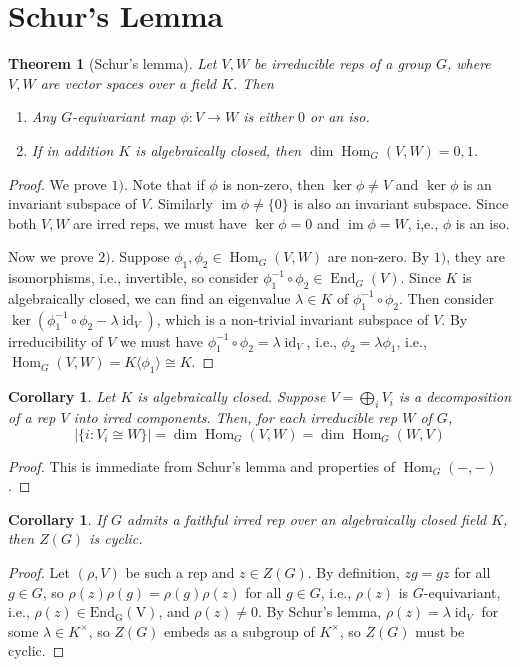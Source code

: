 \documentclass{article}
\theoremstyle{definition}
\theoremstyle{remark}
\theoremstyle{plain}
\newtheorem{thm}[defn]{Theorem}
\newtheorem{crly}[defn]{Corollary}
\newcommand{\Hom}{\operatorname{Hom}}
\newcommand{\im}{\operatorname{im}}
\newcommand{\id}{\operatorname{id}}
\begin{document}
\section{Schur's Lemma}
\begin{thm}[Schur's lemma]
    Let $V, W$ be irreducible reps of a group $G$, where $V, W$ are vector spaces over a field $K$. Then
    \begin{enumerate}
        \item Any $G$-equivariant map $\phi:V\to W$ is either $0$ or an iso.
        \item If in addition $K$ is algebraically closed, then $\dim \Hom_G(V,W)=0,1$. 
    \end{enumerate}
\end{thm}
\begin{proof}
    We prove $1)$. Note that if $\phi$ is non-zero, then $\ker\phi\neq V$ and $\ker\phi$ is an invariant subspace of $V$. Similarly $\im\phi\neq \{0\}$ is also an invariant subspace. Since both $V,W$ are irred reps, we must have $\ker\phi=0$ and $\im\phi=W$, i,e., $\phi$ is an iso.

    Now we prove $2)$. Suppose $\phi_1,\phi_2\in\Hom_G(V,W)$ are non-zero. By $1)$, they are isomorphisms, i.e., invertible, so consider $\phi_1^{-1}\circ\phi_2\in\operatorname{End}_G(V)$. Since $K$ is algebraically closed, we can find an eigenvalue $\lambda\in K$ of $\phi_1^{-1}\circ\phi_2$. Then consider $\ker(\phi_1^{-1}\circ\phi_2-\lambda\id_V)$, which is a non-trivial invariant subspace of $V$. By irreducibility of $V$ we must have $\phi_1^{-1}\circ\phi_2=\lambda\id_V$, i.e., $\phi_2=\lambda\phi_1$, i.e., $\Hom_G(V,W)=K\langle\phi_1\rangle\cong K$.
\end{proof}
\begin{crly}
    Let $K$ is algebraically closed. Suppose $V=\bigoplus_i V_i$ is a decomposition of a rep $V$ into irred components. Then, for each irreducible rep $W$ of $G$,
    \[|\{i:V_i\cong W\}|=\dim\Hom_G(V,W)=\dim\Hom_G(W,V)\]
\end{crly}
\begin{proof}
    This is immediate from Schur's lemma and properties of $\Hom_G(-,-)$.  
\end{proof}
\begin{crly}
    If $G$ admits a faithful irred rep over an algebraically closed field $K$, then $Z(G)$ is cyclic.
\end{crly}
\begin{proof}
    Let $(\rho,V)$ be such a rep and $z\in Z(G)$. By definition, $zg=gz$ for all $g\in G$, so $\rho(z)\rho(g)=\rho(g)\rho(z)$ for all $g\in G$, i.e., $\rho(z)$ is $G$-equivariant, i.e., $\rho(z)\in\operatorname{End_G(V)}$, and $\rho(z)\neq 0$. By Schur's lemma, $\rho(z)=\lambda\id_V$ for some $\lambda\in K^\times$, so $Z(G)$ embeds as a subgroup of $K^\times$, so $Z(G)$ must be cyclic.
\end{proof}
\end{document}
